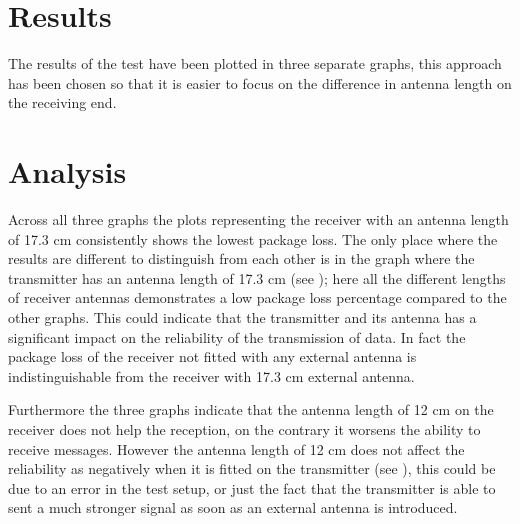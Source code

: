 \section*{Results}
The results of the test have been plotted in three separate graphs, this approach has been chosen so that it is easier to focus on the difference in antenna length on the receiving end.

\section*{Analysis}
Across all three graphs the plots representing the receiver with an antenna length of 17.3 cm consistently shows the lowest package loss. 
The only place where the results are different to distinguish from each other is in the graph where the transmitter has an antenna length of 17.3 cm (see ); here all the different lengths of receiver antennas demonstrates a low package loss percentage compared to the other graphs.
This could indicate that the transmitter and its antenna has a significant impact on the reliability of the transmission of data.
In fact the package loss of the receiver not fitted with any external antenna is indistinguishable from the receiver with 17.3 cm external antenna.

Furthermore the three graphs indicate that the antenna length of 12 cm on the receiver does not help the reception, on the contrary it worsens the ability to receive messages.
However the antenna length of 12 cm does not affect the reliability as negatively when it is fitted on the transmitter (see ), this could be due to an error in the test setup, or just the fact that the transmitter is able to sent a much stronger signal as soon as an external antenna is introduced.

